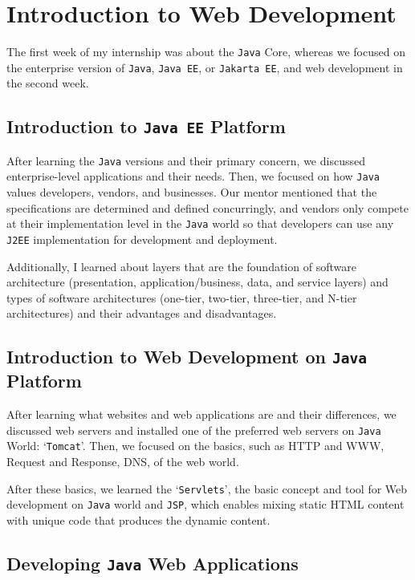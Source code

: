 \section{Introduction to Web Development}

The first week of my internship was about the \texttt{Java} Core, whereas we focused on the enterprise version of \texttt{Java}, \texttt{Java EE}, or \texttt{Jakarta EE}, and web development in the second week.

\subsection{Introduction to \texttt{Java EE} Platform}

After learning the \texttt{Java} versions and their primary concern, we discussed enterprise-level applications and their needs. Then, we focused on how \texttt{Java} values developers, vendors, and businesses. Our mentor mentioned that the specifications are determined and defined concurringly, and vendors only compete at their implementation level in the \texttt{Java} world so that developers can use any \texttt{J2EE} implementation for development and deployment.

Additionally, I learned about layers that are the foundation of software architecture (presentation, application/business, data, and service layers) and types of software architectures (one-tier, two-tier, three-tier, and N-tier architectures) and their advantages and disadvantages.

\subsection{Introduction to Web Development on \texttt{Java} Platform}

After learning what websites and web applications are and their differences, we discussed web servers and installed one of the preferred web servers on \texttt{Java} World: `\texttt{Tomcat}'. Then, we focused on the basics, such as HTTP and WWW, Request and Response, DNS, of the web world.

After these basics, we learned the `\texttt{Servlets}', the basic concept and tool for Web development on \texttt{Java} world and \texttt{JSP}, which enables mixing static HTML content with unique code that produces the dynamic content.

\subsection{Developing \texttt{Java} Web Applications}

